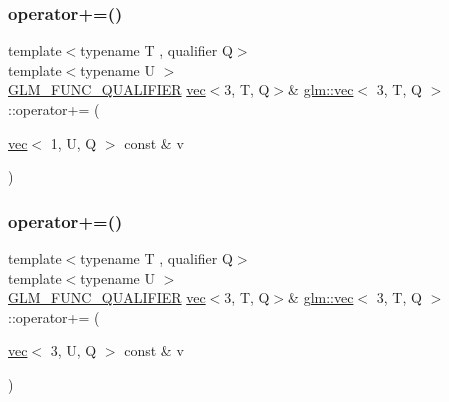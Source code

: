 \subsubsection{\texorpdfstring{operator+=()}{operator+=()}\hspace{0.1cm}{\footnotesize\ttfamily [5/6]}}
{\footnotesize\ttfamily template$<$typename T , qualifier Q$>$ \\
template$<$typename U $>$ \\
\hyperlink{setup_8hpp_a33fdea6f91c5f834105f7415e2a64407}{G\+L\+M\+\_\+\+F\+U\+N\+C\+\_\+\+Q\+U\+A\+L\+I\+F\+I\+ER} \hyperlink{structglm_1_1vec}{vec}$<$3, T, Q$>$\& \hyperlink{structglm_1_1vec}{glm\+::vec}$<$ 3, T, Q $>$\+::operator+= (\begin{DoxyParamCaption}\item[{\hyperlink{structglm_1_1vec}{vec}$<$ 1, U, Q $>$ const \&}]{v }\end{DoxyParamCaption})}

\mbox{\label{structglm_1_1vec_3_013_00_01_t_00_01_q_01_4_a6e025799ccd139ed94645bf141eed279}} 
\subsubsection{\texorpdfstring{operator+=()}{operator+=()}\hspace{0.1cm}{\footnotesize\ttfamily [6/6]}}
{\footnotesize\ttfamily template$<$typename T , qualifier Q$>$ \\
template$<$typename U $>$ \\
\hyperlink{setup_8hpp_a33fdea6f91c5f834105f7415e2a64407}{G\+L\+M\+\_\+\+F\+U\+N\+C\+\_\+\+Q\+U\+A\+L\+I\+F\+I\+ER} \hyperlink{structglm_1_1vec}{vec}$<$3, T, Q$>$\& \hyperlink{structglm_1_1vec}{glm\+::vec}$<$ 3, T, Q $>$\+::operator+= (\begin{DoxyParamCaption}\item[{\hyperlink{structglm_1_1vec}{vec}$<$ 3, U, Q $>$ const \&}]{v }\end{DoxyParamCaption})}

\mbox{\label{structglm_1_1vec_3_013_00_01_t_00_01_q_01_4_a7a914447d1121cc6aa1641280f397d95}} 
